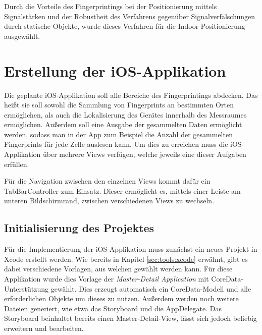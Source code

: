 Durch die Vorteile des Fingerprintings bei der Positionierung mittels Signalstärken und der Robustheit des Verfahrens gegenüber Signalverfälschungen durch statische Objekte, wurde dieses Verfahren für die Indoor Positionierung ausgewählt.


\section{Erstellung der iOS-Applikation}
\label{sec:implementation:iosapplication}

Die geplante iOS-Applikation soll alle Bereiche des Fingerprintings abdecken. 
Das heißt sie soll sowohl die Sammlung von Fingerprints an bestimmten Orten ermöglichen, als auch die Lokalisierung des Gerätes innerhalb des Messraumes ermöglichen.
Außerdem soll eine Ausgabe der gesammelten Daten ermöglicht werden, sodass man in der App zum Beispiel die Anzahl der gesammelten Fingerprints für jede Zelle auslesen kann.
Um dies zu erreichen muss die iOS-Applikation über mehrere Views verfügen, welche jeweils eine dieser Aufgaben erfüllen.

Für die Navigation zwischen den einzelnen Views kommt dafür ein TabBarController zum Einsatz. Dieser ermöglicht es, mittels einer Leiste am unteren Bildschirmrand, zwischen verschiedenen Views zu wechseln.


\subsection{Initialisierung des Projektes}
\label{sec:implementation:iosapplication:initializing}

Für die Implementierung der iOS-Applikation muss zunächst ein neues Projekt in Xcode erstellt werden. Wie bereits in Kapitel \ref{sec:tools:xcode} erwähnt, gibt es dabei verschiedene Vorlagen, aus welchen gewählt werden kann. Für diese Applikation wurde dies Vorlage der \emph{Master-Detail Application} mit CoreData-Unterstützung gewählt. Dies erzeugt automatisch ein CoreData-Modell und alle erforderlichen Objekte um dieses zu nutzen. Außerdem werden noch weitere Dateien generiert, wie etwa das Storyboard und die AppDelegate.
Das Storyboard beinhaltet bereits einen Master-Detail-View, lässt sich jedoch beliebig erweitern und bearbeiten. 

